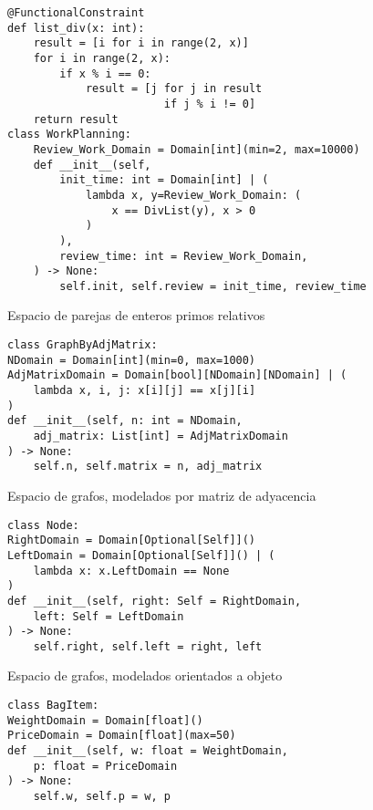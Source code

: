 \begin{codesample}
\begin{listing}[!ht]
    \begin{verbatim}
@FunctionalConstraint
def list_div(x: int):
    result = [i for i in range(2, x)]
    for i in range(2, x):
        if x % i == 0:
            result = [j for j in result 
                        if j % i != 0]
    return result
class WorkPlanning:
    Review_Work_Domain = Domain[int](min=2, max=10000)
    def __init__(self,
        init_time: int = Domain[int] | (
            lambda x, y=Review_Work_Domain: (
                x == DivList(y), x > 0
            )
        ),
        review_time: int = Review_Work_Domain,
    ) -> None:
        self.init, self.review = init_time, review_time
    \end{verbatim}
    \caption{Espacio de parejas de enteros primos relativos}
    \label{lst:primos}
\end{listing}

\begin{listing}[!ht]
    \begin{verbatim}
class GraphByAdjMatrix:
NDomain = Domain[int](min=0, max=1000)
AdjMatrixDomain = Domain[bool][NDomain][NDomain] | (
    lambda x, i, j: x[i][j] == x[j][i]
)
def __init__(self, n: int = NDomain,
    adj_matrix: List[int] = AdjMatrixDomain
) -> None:
    self.n, self.matrix = n, adj_matrix
    \end{verbatim}
    \caption{Espacio de grafos, modelados por matriz de adyacencia}
    \label{lst:adj}
\end{listing}


\begin{listing}[!ht]
    \begin{verbatim}
class Node:
RightDomain = Domain[Optional[Self]]()
LeftDomain = Domain[Optional[Self]]() | (
    lambda x: x.LeftDomain == None
)
def __init__(self, right: Self = RightDomain,
    left: Self = LeftDomain
) -> None:
    self.right, self.left = right, left
    \end{verbatim}
    \caption{Espacio de grafos, modelados orientados a objeto}
    \label{lst:node}
\end{listing}


\begin{listing}[!ht]
    \begin{verbatim}
class BagItem:
WeightDomain = Domain[float]()
PriceDomain = Domain[float](max=50)
def __init__(self, w: float = WeightDomain, 
    p: float = PriceDomain
) -> None:
    self.w, self.p = w, p


\end{verbatim}
\end{listing}
\end{codesample}
